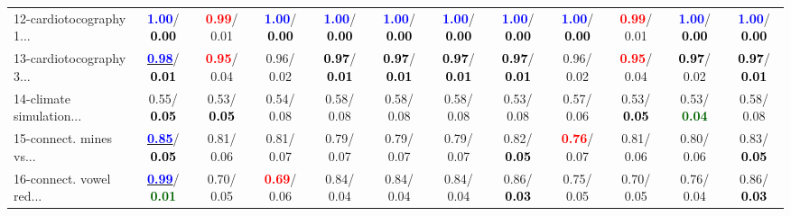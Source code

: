 \begin{table}[h]
\begin{center}
{\begin{tabular}{lc|c|c|c|c|c|c|c|c|c|c}
12-cardiotocography 1... & \textcolor{blue}{\textbf{  1.00}}/\textcolor{black}{\textbf{  0.00}} & \textcolor{red}{\textbf{  0.99}}/  0.01 & \textcolor{blue}{\textbf{  1.00}}/\textcolor{black}{\textbf{  0.00}} & \textcolor{blue}{\textbf{  1.00}}/\textcolor{black}{\textbf{  0.00}} & \textcolor{blue}{\textbf{  1.00}}/\textcolor{black}{\textbf{  0.00}} & \textcolor{blue}{\textbf{  1.00}}/\textcolor{black}{\textbf{  0.00}} & \textcolor{blue}{\textbf{  1.00}}/\textcolor{black}{\textbf{  0.00}} & \textcolor{blue}{\textbf{  1.00}}/\textcolor{black}{\textbf{  0.00}} & \textcolor{red}{\textbf{  0.99}}/  0.01 & \textcolor{blue}{\textbf{  1.00}}/\textcolor{black}{\textbf{  0.00}} & \textcolor{blue}{\textbf{  1.00}}/\textcolor{black}{\textbf{  0.00}} \\
13-cardiotocography 3... & \underline{\textcolor{blue}{\textbf{  0.98}}}/\textcolor{black}{\textbf{  0.01}} & \textcolor{red}{\textbf{  0.95}}/  0.04 &   0.96/  0.02 & \textcolor{black}{\textbf{  0.97}}/\textcolor{black}{\textbf{  0.01}} & \textcolor{black}{\textbf{  0.97}}/\textcolor{black}{\textbf{  0.01}} & \textcolor{black}{\textbf{  0.97}}/\textcolor{black}{\textbf{  0.01}} & \textcolor{black}{\textbf{  0.97}}/\textcolor{black}{\textbf{  0.01}} &   0.96/  0.02 & \textcolor{red}{\textbf{  0.95}}/  0.04 & \textcolor{black}{\textbf{  0.97}}/  0.02 & \textcolor{black}{\textbf{  0.97}}/\textcolor{black}{\textbf{  0.01}} \\
14-climate simulation... &   0.55/\textcolor{black}{\textbf{  0.05}} &   0.53/\textcolor{black}{\textbf{  0.05}} &   0.54/  0.08 &   0.58/  0.08 &   0.58/  0.08 &   0.58/  0.08 &   0.53/  0.08 &   0.57/  0.06 &   0.53/\textcolor{black}{\textbf{  0.05}} &   0.53/\textcolor{darkgreen}{\textbf{  0.04}} &   0.58/  0.08 \\ \hline
15-connect. mines vs... & \underline{\textcolor{blue}{\textbf{  0.85}}}/\textcolor{black}{\textbf{  0.05}} &   0.81/  0.06 &   0.81/  0.07 &   0.79/  0.07 &   0.79/  0.07 &   0.79/  0.07 &   0.82/\textcolor{black}{\textbf{  0.05}} & \textcolor{red}{\textbf{  0.76}}/  0.07 &   0.81/  0.06 &   0.80/  0.06 &   0.83/\textcolor{black}{\textbf{  0.05}} \\
16-connect. vowel red... & \underline{\textcolor{blue}{\textbf{  0.99}}}/\textcolor{darkgreen}{\textbf{  0.01}} &   0.70/  0.05 & \textcolor{red}{\textbf{  0.69}}/  0.06 &   0.84/  0.04 &   0.84/  0.04 &   0.84/  0.04 &   0.86/\textcolor{black}{\textbf{  0.03}} &   0.75/  0.05 &   0.70/  0.05 &   0.76/  0.04 &   0.86/\textcolor{black}{\textbf{  0.03}} \\

\end{tabular}}
\end{center}
\end{table}
